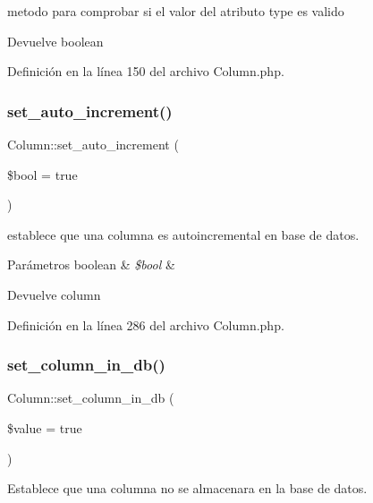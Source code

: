 metodo para comprobar si el valor del atributo type es valido

\begin{DoxyReturn}{Devuelve}
boolean 
\end{DoxyReturn}


Definición en la línea 150 del archivo Column.\+php.

\mbox{\label{class_column_a32c16aaa4042527777de5b48754c3fbd}} 
\subsubsection{\texorpdfstring{set\_auto\_increment()}{set\_auto\_increment()}}
{\footnotesize\ttfamily Column\+::set\+\_\+auto\+\_\+increment (\begin{DoxyParamCaption}\item[{}]{\$bool = {\ttfamily true} }\end{DoxyParamCaption})}

establece que una columna es autoincremental en base de datos.


\begin{DoxyParams}[1]{Parámetros}
boolean & {\em \$bool} & \\
\hline
\end{DoxyParams}
\begin{DoxyReturn}{Devuelve}
column 
\end{DoxyReturn}


Definición en la línea 286 del archivo Column.\+php.

\mbox{\label{class_column_af7dbe1ffea3921f6af03c05ca057e7f2}} 
\subsubsection{\texorpdfstring{set\_column\_in\_db()}{set\_column\_in\_db()}}
{\footnotesize\ttfamily Column\+::set\+\_\+column\+\_\+in\+\_\+db (\begin{DoxyParamCaption}\item[{}]{\$value = {\ttfamily true} }\end{DoxyParamCaption})}

Establece que una columna no se almacenara en la base de datos.


